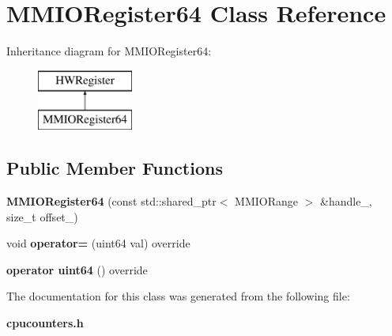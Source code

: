 \section{M\+M\+I\+O\+Register64 Class Reference}
\label{classMMIORegister64}
Inheritance diagram for M\+M\+I\+O\+Register64\+:\begin{figure}[H]
\begin{center}
\leavevmode
\includegraphics[height=2.000000cm]{classMMIORegister64}
\end{center}
\end{figure}
\subsection*{Public Member Functions}
\begin{DoxyCompactItemize}
\item 
\mbox{\label{classMMIORegister64_a882e9ddb2b71073583fcd1de93787215}} 
{\bfseries M\+M\+I\+O\+Register64} (const std\+::shared\+\_\+ptr$<$ M\+M\+I\+O\+Range $>$ \&handle\+\_\+, size\+\_\+t offset\+\_\+)
\item 
\mbox{\label{classMMIORegister64_ac473c8f9e77e5cddd28b3789d48e1148}} 
void {\bfseries operator=} (uint64 val) override
\item 
\mbox{\label{classMMIORegister64_a20598982b13caf4a050a37c9cc719c18}} 
{\bfseries operator uint64} () override
\end{DoxyCompactItemize}


The documentation for this class was generated from the following file\+:\begin{DoxyCompactItemize}
\item 
\textbf{ cpucounters.\+h}\end{DoxyCompactItemize}
